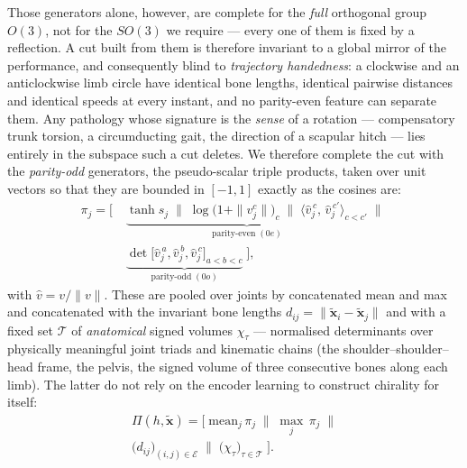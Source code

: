 Those generators alone, however, are complete for the \emph{full} orthogonal group $O(3)$, not for the
$SO(3)$ we require --- every one of them is fixed by a reflection. A cut built from them is therefore
invariant to a global mirror of the performance, and consequently blind to \emph{trajectory
handedness}: a clockwise and an anticlockwise limb circle have identical bone lengths, identical
pairwise distances and identical speeds at every instant, and no parity-even feature can separate
them. Any pathology whose signature is the \emph{sense} of a rotation --- compensatory trunk torsion,
a circumducting gait, the direction of a scapular hitch --- lies entirely in the subspace such a cut
deletes. We therefore complete the cut with the \emph{parity-odd} generators, the pseudo-scalar triple
products, taken over unit vectors so that they are bounded in $[-1,1]$ exactly as the cosines are:
%
\begin{equation}
\label{eq:cut}
\begin{aligned}
\pi_j=\Big[\;
&\underbrace{\tanh s_j \;\big\|\; \log\big(1+\|v_j^{c}\|\big)_{c} \;\big\|\;
\big\langle \hat v_j^{\,c},\,\hat v_j^{\,c'}\big\rangle_{c<c'}}_{\text{parity-even}\;(0e)}
\;\big\|\;\\[-2pt]
&\underbrace{\det\big[\hat v_j^{\,a},\hat v_j^{\,b},\hat v_j^{\,c}\big]_{a<b<c}}_{\text{parity-odd}\;(0o)}
\;\Big],
\end{aligned}
\end{equation}
%
with $\hat v = v/\|v\|$. These are pooled over joints by concatenated mean and max and concatenated
with the invariant bone lengths $d_{ij}=\|\tilde{\bm{x}}_{i}-\tilde{\bm{x}}_{j}\|$ and with a fixed set
$\mathcal{T}$ of \emph{anatomical} signed volumes $\chi_\tau$ --- normalised determinants over
physically meaningful joint triads and kinematic chains (the shoulder--shoulder--head frame, the
pelvis, the signed volume of three consecutive bones along each limb). The latter do not rely on the
encoder learning to construct chirality for itself:
%
\begin{equation}
\label{eq:pi}
\begin{gathered}
\Pi(h,\tilde{\bm{x}})=\Big[\;\mathrm{mean}_j\,\pi_j \;\big\|\; \max_j\,\pi_j \;\big\|\\[2pt]
\big(d_{ij}\big)_{(i,j)\in\mathcal{E}}\;\big\|\;\big(\chi_\tau\big)_{\tau\in\mathcal{T}}\;\Big].
\end{gathered}
\end{equation}

